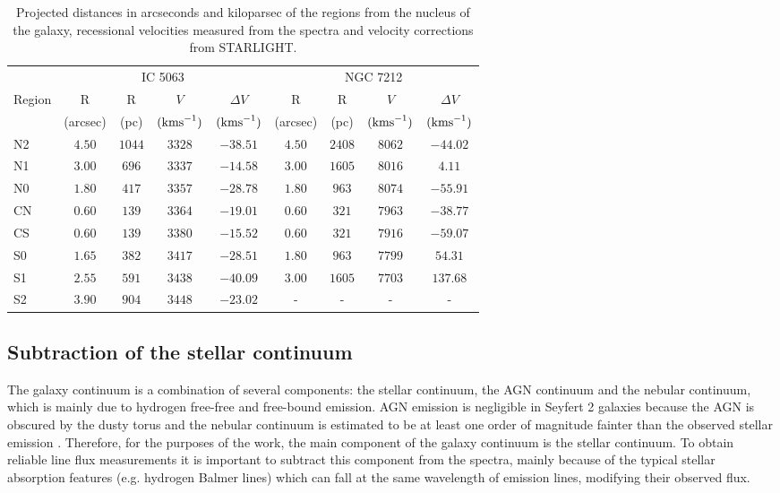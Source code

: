 \documentclass[../main.tex]{subfiles}
\begin{document}
\begin{table}
\caption[]{Projected distances in arcseconds and kiloparsec of the regions from the nucleus of the galaxy, recessional velocities measured from the spectra and velocity corrections from STARLIGHT.}
\label{tab:reg}
\centering
\small
\begin{tabular}[width=\columnwidth]{lcccccccc}
\hline
& \multicolumn{4}{c}{IC 5063}&\multicolumn{4}{c}{NGC 7212}\\
Region& R&R&$V$&$\Delta V$&R&R&$V$&$\Delta V$\\
& (arcsec)& (pc)&$(\si{\kms})$&$(\si{\kms})$&(arcsec)&(pc)&$(\si{\kms})$&$(\si{\kms})$\\
\hline
N2&$4.50$&$1044$&$3328$&$-38.51$&$4.50$&$2408$&$8062$&$-44.02$\\
N1&$3.00$&$696$&$3337$&$-14.58$&$3.00$&$1605$&$8016$&$4.11$\\
N0&$1.80$&$417$&$3357$&$-28.78$&$1.80$&$963$&$8074$&$-55.91$\\
CN&$0.60$&$139$&$3364$&$-19.01$&$0.60$&$321$&$7963$&$-38.77$\\
CS&$0.60$&$139$&$3380$&$-15.52$&$0.60$&$321$&$7916$&$-59.07$\\
S0&$1.65$&$382$&$3417$&$-28.51$&$1.80$&$963$&$7799$&$54.31$\\
S1&$2.55$&$591$&$3438$&$-40.09$&$3.00$&$1605$&$7703$&$137.68$\\
S2&$3.90$&$904$&$3448$&$-23.02$&-&-&-&-\\
\hline
\end{tabular}
\normalsize
\end{table}

\subsection{Subtraction of the stellar continuum}
\label{sec:starcont}


The galaxy continuum is a combination of several components: the stellar continuum, the AGN continuum and the nebular continuum, which is mainly due to hydrogen free-free and free-bound emission.
AGN emission is negligible in Seyfert 2 galaxies because the AGN is obscured by the dusty torus \citep[e.g.][]{Beckmann12} and the nebular continuum is estimated to be at least one order of magnitude fainter than the observed stellar emission \citep{OsterbrockAGN89}.
Therefore, for the purposes of the work, the main component of the galaxy continuum is the stellar continuum.
To obtain reliable line flux measurements it is important to subtract this component from the spectra, mainly because of the typical stellar absorption features (e.g. hydrogen Balmer lines) which can fall at the same wavelength of emission lines, modifying their observed flux.
\end{document}
